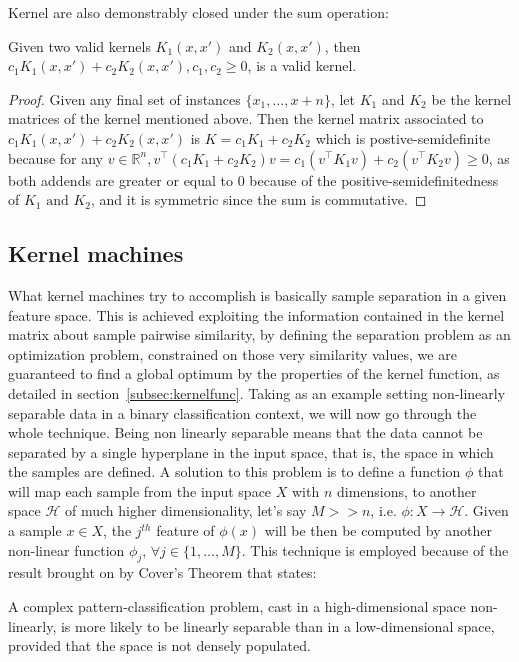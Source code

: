 Kernel are also demonstrably closed under the sum operation:
\begin{theorem}
    Given two valid kernels $K_1(x,x')$ and $K_2(x,x')$, then $c_1K_1(x,x') +
    c_2K_2(x,x'), c_1,c_2 \geq 0$, is a valid kernel.
\end{theorem}
\begin{proof}
    Given any final set of instances $\{x_1,\dots,x+n\}$, let $K_1$ and $K_2$ be
    the kernel matrices of the kernel mentioned above. Then the kernel matrix
    associated to $c_1K_1(x,x') + c_2K_2(x,x')$ is $K=c_1K_1+c_2K_2$ which is
    postive-semidefinite because for any $v\in\mathbb{R}^n, v^\top(c_1K_1+c_2K_2)v
    = c_1(v^\top K_1v)+c_2(v^\top K_2v) \geq 0$, as both addends are greater or
    equal to 0 because of the positive-semidefinitedness of $K_1\text{ and }K_2$,
    and it is symmetric since the sum is commutative.
\end{proof}

\subsection{Kernel machines}
\label{subsec:kmachines}

What kernel machines try to accomplish is basically sample separation in a given
feature space.
This is achieved exploiting the information contained in the kernel matrix about
sample pairwise similarity, by defining the separation problem as an optimization
problem, constrained on those very similarity values, we are guaranteed to find
a global optimum by the properties of the kernel function, as detailed in
section~\ref{subsec:kernelfunc}.
Taking as an example setting non-linearly separable data in a binary classification
context, we will now go through the whole technique.
Being non linearly separable means that the data cannot be separated by a single
hyperplane in the input space, that is, the space in which the samples are defined.
A solution to this problem is to define a function $\phi$ that will map each
sample from the input space $X$ with $n$ dimensions, to another space $\mathcal{H}$
of much higher dimensionality, let's say $M >> n$, i.e. $\phi:X\to \mathcal{H}$.
Given a sample $x \in X$, the $j^{th}$ feature of $\phi(x)$ will be then be
computed by another non-linear function $\phi_j$, $\forall j \in \{1,\dots,M\}$.
This technique is employed because of the result brought on by Cover's Theorem
that states:

\begin{theorem}
    A complex pattern-classification problem, cast in a high-dimensional space
    non-linearly, is more likely to be linearly separable than in a low-dimensional
    space, provided that the space is not densely populated.
\end{theorem}

